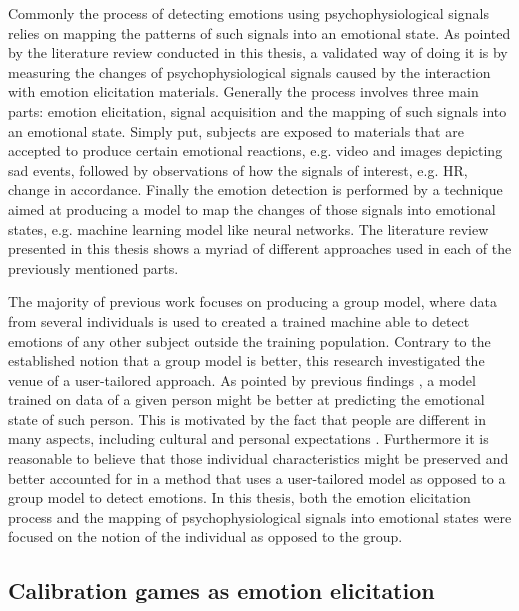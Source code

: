 Commonly the process of detecting emotions using psychophysiological signals relies on mapping the patterns of such signals into an emotional state. As pointed by the literature review conducted in this thesis, a validated way of doing it is by measuring the changes of psychophysiological signals caused by the interaction with emotion elicitation materials. Generally the process involves three main parts: emotion elicitation, signal acquisition and the mapping of such signals into an emotional state. Simply put, subjects are exposed to materials that are accepted to produce certain emotional reactions, e.g. video and images depicting sad events, followed by observations of how the signals of interest, e.g. HR, change in accordance. Finally the emotion detection is performed by a technique aimed at producing a model to map the changes of those signals into emotional states, e.g. machine learning model like neural networks. The literature review presented in this thesis shows a myriad of different approaches used in each of the previously mentioned parts.

The majority of previous work focuses on producing a group model, where data from several individuals is used to created a trained machine able to detect emotions of any other subject outside the training population. Contrary to the established notion that a group model is better, this research investigated the venue of a user-tailored approach. As pointed by previous findings \parencite{something}, a model trained on data of a given person might be better at predicting the emotional state of such person. This is motivated by the fact that people are different in many aspects, including cultural and personal expectations \parencite{some}. Furthermore it is reasonable to believe that those individual characteristics might be preserved and better accounted for in a method that uses a user-tailored model as opposed to a group model to detect emotions. In this thesis, both the emotion elicitation process and the mapping of psychophysiological signals into emotional states were focused on the notion of the individual as opposed to the group.

\subsection{Calibration games as emotion elicitation}


